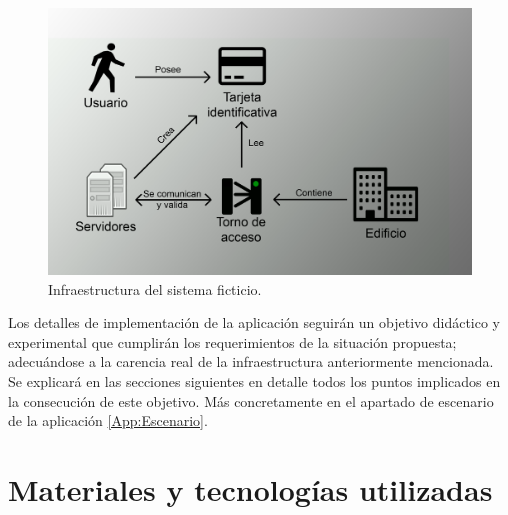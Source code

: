 \documentclass[../PFC.tex]{subfiles}
\begin{document}
\begin{figure}[!ht]
  \centering
  \includegraphics[width=1\textwidth]{./img/arquitecturaVirtual}
  \caption{Infraestructura del sistema ficticio.}
  \label{img:infraestructura}
\end{figure}

Los detalles de implementación de la aplicación seguirán un objetivo didáctico y experimental que cumplirán los requerimientos de la situación propuesta; adecuándose a la carencia real de la infraestructura anteriormente mencionada. Se explicará en las secciones siguientes en detalle todos los puntos implicados en la consecución de este objetivo. Más concretamente en el apartado de escenario de la aplicación \ref{App:Escenario}.

\section{Materiales y tecnologías utilizadas}
\label{App:Materiales y tecnologías utilizadas}
\end{document}
